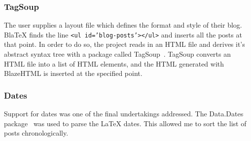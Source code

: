   \subsubsection{TagSoup}

    The user supplies a layout file which defines the format and style of their blog. BlaTeX finds the line \texttt{<ul id='blog-posts'></ul>} and inserts all the posts at that point. In order to do so, the project reads in an HTML file and derives it's abstract syntax tree with a package called TagSoup~\cite{tagsoup}. TagSoup converts an HTML file into a list of HTML elements, and the HTML generated with BlazeHTML is inserted at the specified point. 

  \subsubsection{Dates}

    Support for dates was one of the final undertakings addressed. The Data.Dates package~\cite{dates} was used to parse the LaTeX dates. This allowed me to sort the list of posts chronologically.  